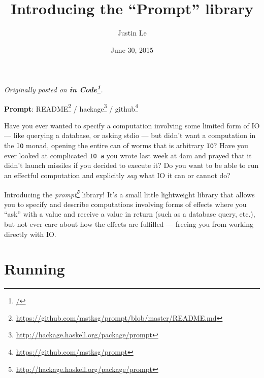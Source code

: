 \documentclass[]{article}
\title{Introducing the ``Prompt'' library}
\author{Justin Le}
\date{June 30, 2015}
\newenvironment{Shaded}{}{}
\newcommand{\KeywordTok}[1]{\textcolor[rgb]{0.00,0.44,0.13}{\textbf{{#1}}}}
\newcommand{\DataTypeTok}[1]{\textcolor[rgb]{0.56,0.13,0.00}{{#1}}}
\newcommand{\StringTok}[1]{\textcolor[rgb]{0.25,0.44,0.63}{{#1}}}
\newcommand{\CommentTok}[1]{\textcolor[rgb]{0.38,0.63,0.69}{\textit{{#1}}}}
\newcommand{\OtherTok}[1]{\textcolor[rgb]{0.00,0.44,0.13}{{#1}}}
\newcommand{\FunctionTok}[1]{\textcolor[rgb]{0.02,0.16,0.49}{{#1}}}
\newcommand{\NormalTok}[1]{{#1}}
\renewcommand{\href}[2]{#2\footnote{\url{#1}}}
\begin{document}
\maketitle

\emph{Originally posted on \textbf{\href{/}{in Code}}.}

\textbf{Prompt}:
\href{https://github.com/mstksg/prompt/blob/master/README.md}{README} /
\href{http://hackage.haskell.org/package/prompt}{hackage} /
\href{https://github.com/mstksg/prompt}{github}

Have you ever wanted to specify a computation involving some limited
form of IO --- like querying a database, or asking stdio --- but didn't
want a computation in the \texttt{IO} monad, opening the entire can of
worms that is arbitrary \texttt{IO}? Have you ever looked at complicated
\texttt{IO\ a} you wrote last week at 4am and prayed that it didn't
launch missiles if you decided to execute it? Do you want to be able to
run an effectful computation and explicitly \emph{say} what IO it can or
cannot do?

Introducing the
\emph{\href{http://hackage.haskell.org/package/prompt}{prompt}} library!
It's a small little lightweight library that allows you to specify and
describe computations involving forms of effects where you ``ask'' with
a value and receive a value in return (such as a database query, etc.),
but not ever care about how the effects are fulfilled --- freeing you
from working directly with IO.

\begin{Shaded}
\end{Shaded}

\section{Running}\label{running}
\end{document}
